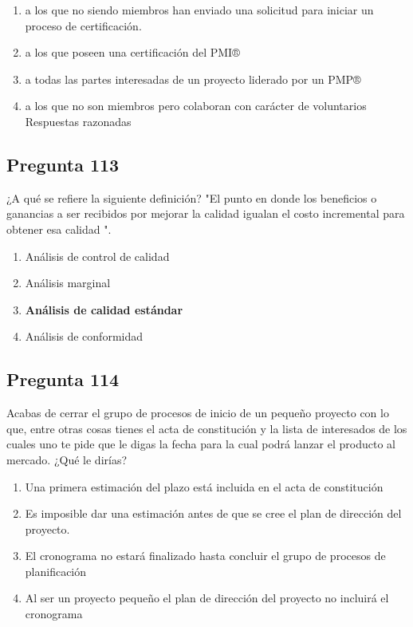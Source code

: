 \documentclass[11pt,a4paper]{article}
\begin{document}
\begin{enumerate}[label=\alph*)]
  \item a los que no siendo miembros han enviado una solicitud para iniciar un proceso de certificación.
  \item a los que poseen una certificación del PMI®
  \item a todas las partes interesadas de un proyecto liderado por un PMP®
  \item a los que no son miembros pero colaboran con carácter de voluntarios Respuestas razonadas
\end{enumerate}

\subsection*{Pregunta 113}
¿A qué se refiere la siguiente definición? "El punto en donde los beneficios o ganancias a ser recibidos por mejorar la calidad igualan el costo incremental para obtener esa calidad ".

\begin{enumerate}[label=\alph*)]
  \item Análisis de control de calidad
  \item Análisis marginal
  \item \textbf{Análisis de calidad estándar}
  \item Análisis de conformidad
\end{enumerate}

\subsection*{Pregunta 114}
Acabas de cerrar el grupo de procesos de inicio de un pequeño proyecto con lo que, entre otras cosas tienes el acta de constitución y la lista de interesados de los cuales uno te pide que le digas la fecha para la cual podrá lanzar el producto al mercado. ¿Qué le dirías?

\begin{enumerate}[label=\alph*)]
  \item Una primera estimación del plazo está incluida en el acta de constitución
  \item Es imposible dar una estimación antes de que se cree el plan de dirección del proyecto.
  \item El cronograma no estará finalizado hasta concluir el grupo de procesos de planificación
  \item Al ser un proyecto pequeño el plan de dirección del proyecto no incluirá el cronograma
\end{enumerate}
\end{document}
